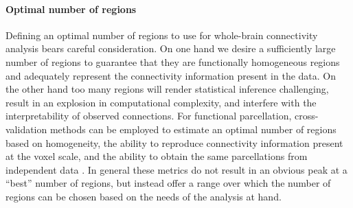 \documentclass[5p]{elsarticle}
\begin{document}
\paragraph{Optimal number of regions}
%
Defining an optimal number of regions to use for whole-brain connectivity analysis bears
careful consideration. On one hand we desire a sufficiently large number of
regions to guarantee that they are functionally homogeneous regions and adequately 
represent the connectivity information present in the data. On the other hand
too many regions will render statistical inference challenging, 
result in an explosion in computational complexity,
and interfere with the interpretability of observed connections. For functional
parcellation, cross-validation methods can be employed to estimate an optimal 
number of regions based on homogeneity, the ability to reproduce 
connectivity information present at the voxel scale, and the ability to
obtain the same parcellations from independent data 
\cite{craddock2012, blumensath2012}. In general these metrics do not result in an
obvious peak at a ``best'' number of regions, but instead offer a range over
which the number of regions can be chosen based on the needs of the analysis at
hand.
\end{document}
